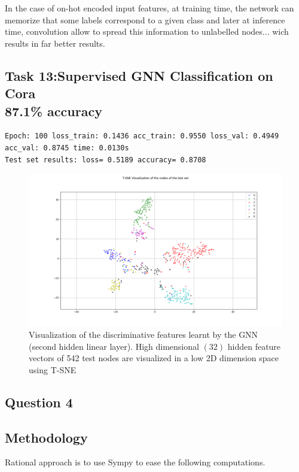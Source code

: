 \documentclass[a4paper]{article}
\begin{document}
In the case of on-hot encoded input features, at training time, the network can memorize that some labels correspond
to a given class and later at inference time, convolution allow to spread this information to unlabelled nodes...
wich results in far better results.



\subsection*{Task 13:Supervised GNN Classification on Cora \\ 87.1\% accuracy}
\begin{verbatim}
Epoch: 100 loss_train: 0.1436 acc_train: 0.9550 loss_val: 0.4949 acc_val: 0.8745 time: 0.0130s
Test set results: loss= 0.5189 accuracy= 0.8708
\end{verbatim}


\begin{figure}[ht]
    \centering
    \includegraphics[width=1.\textwidth]{figures/tSNE_Cora.png}
    \caption{Visualization of the discriminative features learnt by the GNN (second hidden linear layer). 
    High dimensional $(32)$ hidden feature vectors of 542 test nodes are visualized in a low 2D dimension space using T-SNE}
    \label{fig:tsne_cora}
\end{figure}
\break
\subsection*{Question 4}
\subsection*{Methodology}

Rational approach is to use Sympy to ease the following computations.
\end{document}
